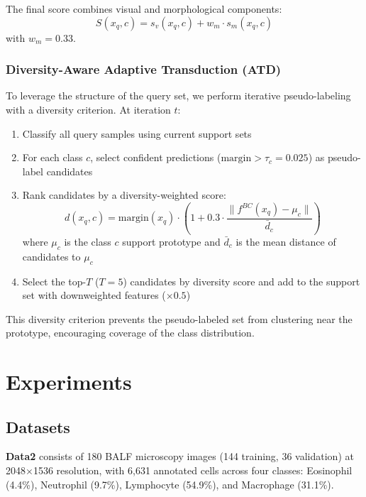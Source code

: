 \documentclass[preprint,review,12pt]{elsarticle}
\begin{document}
The final score combines visual and morphological components:
\begin{equation}
    S(x_q, c) = s_v(x_q, c) + w_m \cdot s_m(x_q, c)
\end{equation}
with $w_m = 0.33$.

\subsubsection{Diversity-Aware Adaptive Transduction (ATD)}

To leverage the structure of the query set, we perform iterative pseudo-labeling with a diversity criterion. At iteration $t$:

\begin{enumerate}
    \item Classify all query samples using current support sets
    \item For each class $c$, select confident predictions ($\text{margin} > \tau_c = 0.025$) as pseudo-label candidates
    \item Rank candidates by a diversity-weighted score:
    \begin{equation}
        d(x_q, c) = \text{margin}(x_q) \cdot \left(1 + 0.3 \cdot \frac{\|f^{BC}(x_q) - \mu_c\|}{\bar{d}_c}\right)
    \end{equation}
    where $\mu_c$ is the class $c$ support prototype and $\bar{d}_c$ is the mean distance of candidates to $\mu_c$
    \item Select the top-$T$ ($T=5$) candidates by diversity score and add to the support set with downweighted features ($\times 0.5$)
\end{enumerate}

This diversity criterion prevents the pseudo-labeled set from clustering near the prototype, encouraging coverage of the class distribution.


\section{Experiments}
\label{sec:experiments}

\subsection{Datasets}

\textbf{Data2} consists of 180 BALF microscopy images (144 training, 36 validation) at 2048$\times$1536 resolution, with 6,631 annotated cells across four classes: Eosinophil (4.4\%), Neutrophil (9.7\%), Lymphocyte (54.9\%), and Macrophage (31.1\%).
\end{document}
